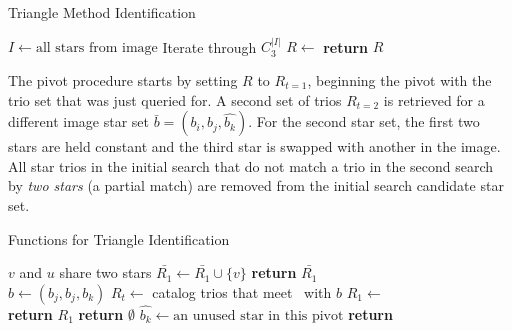 \begin{algorithm}
    \caption{Triangle Method Identification} \label{algorithm:triangleIdentification}
    \begin{algorithmic}[1]
        \State $I \gets \text{all stars} \text{ from image}$
          \Comment Iterate through $C^{|I|}_3$
        \State $R \gets$ 
        \State \textbf{return} $R$
        \EndIf
        \EndFor
        \EndFor
        \EndFor
        \EndProcedure
    \end{algorithmic}
\end{algorithm}

The pivot procedure starts by setting $R$ to $R_{t=1}$, beginning the pivot with the trio set that was just queried
for.
A second set of trios $R_{t=2}$ is retrieved for a different image star set $\bar{b} = (b_i, b_j, \hat{b_k})$.
For the second star set, the first two stars are held constant and the third star is swapped with another in the image.
All star trios in the initial search that do not match a trio in the second search by \textit{two stars} (a partial
match) are removed from the initial search candidate star set.

\begin{algorithm}
    \caption{Functions for Triangle Identification} \label{algorithm:triangleHelper}
    \begin{algorithmic}[1]
        \LineComment $v$ and $u$ share two stars
        \State $\bar{R_1} \gets \bar{R_1} \cup \{v\}$
        \EndIf
        \EndFor
        \State \textbf{return} $\bar{R_1}$
        \EndFunction
        \\
        \State $b \gets (b_j, b_j, b_k)$
        \State $R_t \gets $ catalog trios that meet~ with $b$
        \State $R_1 \gets $ 
        \\
        \State \textbf{return} $R_1$
        \State \textbf{return} $\emptyset$
        \Else
        \State $\hat{b_k} \gets \text{an unused star in this pivot}$
        \State \textbf{return} 
        \EndIf
        \EndFunction
    \end{algorithmic}
\end{algorithm}

